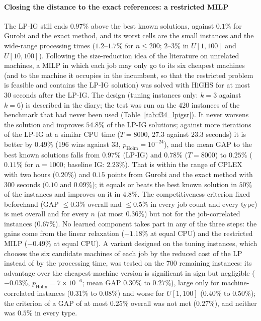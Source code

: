 \documentclass[final,3p,times,11pt,authoryear]{elsarticle}
\begin{document}
\paragraph{Closing the distance to the exact references: a restricted MILP}
The LP-IG still ends $0.97\%$ above the best known solutions, against $0.1\%$ for Gurobi and the exact method, and its worst cells are the small instances and the wide-range processing times ($1.2$--$1.7\%$ for $n\leq200$; $2$--$3\%$ in $U[1,100]$ and $U[10,100]$). Following the size-reduction idea of the literature on unrelated machines, a MILP in which each job may only go to its six cheapest machines (and to the machine it occupies in the incumbent, so that the restricted problem is feasible and contains the LP-IG solution) was solved with HiGHS for at most $30$ seconds after the LP-IG. The design (tuning instances only: $k=3$ against $k=6$) is described in the diary; the test was run on the $420$ instances of the benchmark that had never been used (Table~\ref{tab:f34_lpigsr}). It never worsens the solution and improves $54.8\%$ of the LP-IG solutions; against more iterations of the LP-IG at a similar CPU time ($T=8000$, $27.3$ against $23.3$ seconds) it is better by $0.49\%$ ($196$ wins against $33$, $p_{\mathrm{Holm}}=10^{-24}$), and the mean GAP to the best known solutions falls from $0.97\%$ (LP-IG) and $0.78\%$ ($T=8000$) to $0.25\%$ ($0.11\%$ for $n=1000$; baseline IG: $2.23\%$). That is within the range of CPLEX with two hours ($0.20\%$) and $0.15$ points from Gurobi and the exact method with $300$ seconds ($0.10$ and $0.09\%$); it equals or beats the best known solution in $50\%$ of the instances and improves on it in $4.8\%$. The competitiveness criterion fixed beforehand (GAP $\leq0.3\%$ overall and $\leq0.5\%$ in every job count and every type) is met overall and for every $n$ (at most $0.36\%$) but not for the job-correlated instances ($0.67\%$). No learned component takes part in any of the three steps: the gains come from the linear relaxation ($-1.18\%$ at equal CPU) and the restricted MILP ($-0.49\%$ at equal CPU). A variant designed on the tuning instances, which chooses the six candidate machines of each job by the reduced cost of the LP instead of by the processing time, was tested on the $700$ remaining instances: its advantage over the cheapest-machine version is significant in sign but negligible ($-0.03\%$, $p_{\mathrm{Holm}}=7\times10^{-6}$; mean GAP $0.30\%$ to $0.27\%$), large only for machine-correlated instances ($0.31\%$ to $0.08\%$) and worse for $U[1,100]$ ($0.40\%$ to $0.50\%$); the criterion of a GAP of at most $0.25\%$ overall was not met ($0.27\%$), and neither was $0.5\%$ in every type.
\end{document}
